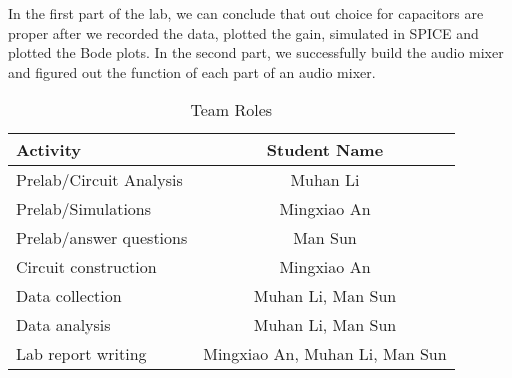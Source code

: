 In the first part of the lab, we can conclude that out choice for capacitors are proper after we recorded the data, plotted the gain, simulated in SPICE and plotted the Bode plots. In the second part, we successfully build the audio mixer and figured out the function of each part of an audio mixer. %

\begin{table}[!htbp]
	\caption{Team Roles}
	\renewcommand\arraystretch{1.5}\centering
	\begin{tabular}{l|c}
		\hline
		\hline
		Activity					&	Student Name 	\\
		\hline
		Prelab/Circuit Analysis		& 	Muhan Li		\\
		\hline
		Prelab/Simulations			&	Mingxiao An		\\
		\hline
		Prelab/answer questions		&	Man Sun			\\
		\hline
		Circuit construction		&	Mingxiao An		\\
		\hline
		Data collection				& Muhan Li, Man Sun	\\
		\hline
		Data analysis				& Muhan Li, Man Sun \\
		\hline
		Lab report writing			& Mingxiao An, Muhan Li, Man Sun \\
		\hline
		\hline
	\end{tabular}\\
\end{table}
